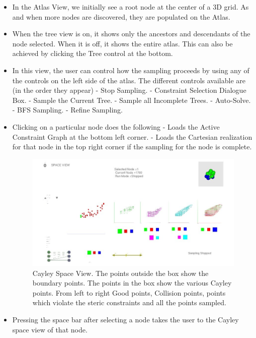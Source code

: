 \documentclass[10pt]{article}
\begin{document}
\begin{itemize}
\item In the Atlas View, we initially see a root node at the center of a 3D
		grid. As and when more nodes are discovered, they are populated on the
		Atlas.

\item When the tree view is on, it shows only the ancestors and descendants of
		the node selected. When it is off, it shows the entire atlas. This can
		also be achieved by clicking the Tree control at the bottom.

\item In this view, the user can control how the sampling proceeds by using any
		of the controls on the left side of the atlas. The different controls
		available are (in the order they appear)
    - Stop Sampling.
    - Constraint Selection Dialogue Box.
    - Sample the Current Tree.
	- Sample all Incomplete Trees.
	- Auto-Solve.
    - BFS Sampling.
    - Refine Sampling.

\item Clicking on a particular node does the following - Loads the Active
		Constraint Graph at the bottom left corner.  - Loads the Cartesian
		realization for that node in the top right corner if the sampling for
		the node is complete.

\begin{figure}
	\centering
	\includegraphics[scale=0.5] {fig/CayleySpaceView.jpg}
	\caption{Cayley Space View. The points outside the box show the boundary
points. The points in the box show the various Cayley points. From left to
right Good points, Collision points, points which violate the steric
constraints and all the points sampled.}
\label{Cayleyspaceview}
\end{figure}


\item Pressing the space bar after selecting a node takes the user to the
		Cayley space view of that node.


\end{itemize}
\end{document}
